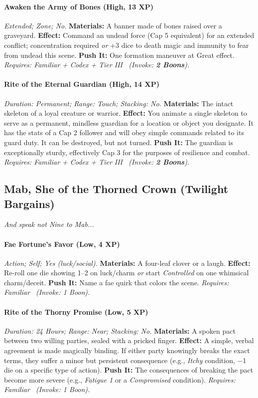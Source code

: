 \documentclass[12pt,twoside]{book}
\begin{document}
\paragraph{Awaken the Army of Bones (High, 13 XP)} \emph{Extended; Zone; No.}
\textbf{Materials:} A banner made of bones raised over a graveyard.
\textbf{Effect:} Command an undead force (Cap 5 equivalent) for an extended conflict; concentration required \emph{or} +3 dice to death magic and immunity to fear from undead this scene.
\textbf{Push It:} One formation maneuver at Great effect.
\emph{Requires: Familiar + Codex + Tier III \ (\textit{Invoke:} \textbf{2 Boons}).}
\paragraph{Rite of the Eternal Guardian (High, 14 XP)} \emph{Duration: Permanent; Range: Touch; Stacking: No.}
\textbf{Materials:} The intact skeleton of a loyal creature or warrior.
\textbf{Effect:} You animate a single skeleton to serve as a permanent, mindless guardian for a location or object you designate. It has the stats of a Cap 2 follower and will obey simple commands related to its guard duty. It can be destroyed, but not turned.
\textbf{Push It:} The guardian is exceptionally sturdy, effectively Cap 3 for the purposes of resilience and combat.
\emph{Requires: Familiar + Codex + Tier III \ (\textit{Invoke:} \textbf{2 Boons}).}

\subsection{Mab, She of the Thorned Crown (Twilight Bargains)}
\textit{And speak not Nine to Mab...}
\paragraph{Fae Fortune’s Favor (Low, 4 XP)} \emph{Action; Self; Yes (luck/social).}
\textbf{Materials:} A four-leaf clover or a laugh.
\textbf{Effect:} Re-roll one die showing 1–2 on luck/charm \emph{or} start \emph{Controlled} on one whimsical charm/deceit.
\textbf{Push It:} Name a fae quirk that colors the scene.
\emph{Requires: Familiar \ (\textit{Invoke:} 1 Boon).}
\paragraph{Rite of the Thorny Promise (Low, 5 XP)} \emph{Duration: 24 Hours; Range: Near; Stacking: No.}
\textbf{Materials:} A spoken pact between two willing parties, sealed with a pricked finger.
\textbf{Effect:} A simple, verbal agreement is made magically binding. If either party knowingly breaks the exact terms, they suffer a minor but persistent consequence (e.g., \emph{Itchy} condition, −1 die on a specific type of action).
\textbf{Push It:} The consequences of breaking the pact become more severe (e.g., \emph{Fatigue 1} or a \emph{Compromised} condition).
\emph{Requires: Familiar \ (\textit{Invoke:} 1 Boon).}
\end{document}
